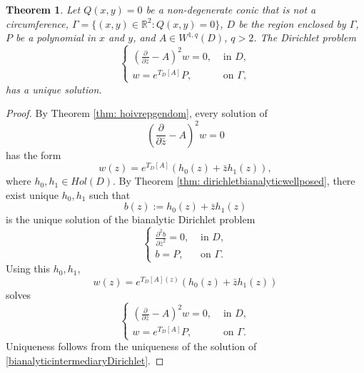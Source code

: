 \documentclass[12pt,reqno]{amsart}
\newtheorem{theorem}{Theorem}[section]
\theoremstyle{definition}
\theoremstyle{remark}
\newcommand{\p}{\partial}
\newcommand{\z}{\bar z}
\begin{document}
    \begin{theorem}\label{thm: mainthm}
        Let $Q(x,y) = 0$ be a non-degenerate conic that is not a circumference, $\Gamma = \{(x,y) \in \mathbb{R}^2 : Q(x,y) = 0\}$, $D$ be the region enclosed by $\Gamma$, $P$ be a polynomial in $x$ and $y$, and $A \in W^{1,q}(D)$, $q>2$. The Dirichlet problem 
        \begin{equation}\label{eq: complexbitsadzedirichlet}
            \begin{cases}
                \left( \frac{\p}{\p\z} - A \right)^2 w = 0, & \text{ in } D,\\
                w = e^{T_D[A]}P, & \text{ on } \Gamma,
            \end{cases}
        \end{equation}
        has a unique solution. 
    \end{theorem}

    \begin{proof}
        By Theorem \ref{thm: hoivrepgendom}, every solution of 
        \[
            \left( \frac{\p}{\p\z} - A \right)^2 w = 0
        \]
        has the form 
        \[
            w(z) = e^{T_D[A]}(h_0(z) + \z h_1(z)),
        \]
        where $h_0,h_1 \in Hol(D)$. By Theorem \ref{thm: dirichletbianalyticwellposed}, there exist unique $h_0, h_1$ such that 
        \[
            b(z) := h_0(z) + \z h_1(z)
        \]
        is the unique solution of the bianalytic Dirichlet problem
        \begin{equation}\label{bianalyticintermediaryDirichlet}
            \begin{cases}
                \frac{\p^2 b}{\p\z^2}= 0, & \text{ in } D,\\
                b = P, & \text{ on } \Gamma.
            \end{cases}
        \end{equation}
        Using this $h_0,h_1$, 
        \[
            w(z) = e^{T_D[A](z)}(h_0(z) + \z h_1(z))
        \]
        solves 
        \[
            \begin{cases}
                \left( \frac{\p}{\p\z} - A \right)^2 w = 0, & \text{ in } D,\\
                w = e^{T_D[A]}P, & \text{ on } \Gamma.
            \end{cases}
        \]
        Uniqueness follows from the uniqueness of the solution of \eqref{bianalyticintermediaryDirichlet}. 
        
    \end{proof}
\end{document}
